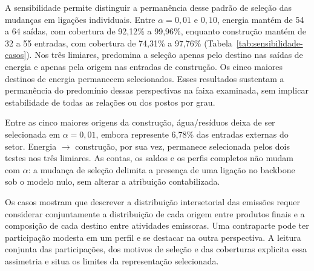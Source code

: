 A sensibilidade permite distinguir a permanência desse padrão de seleção das mudanças em ligações individuais. Entre $\alpha=0{,}01$ e $0{,}10$, energia mantém de 54 a 64 saídas, com cobertura de 92,12\% a 99,96\%, enquanto construção mantém de 32 a 55 entradas, com cobertura de 74,31\% a 97,76\% (Tabela~\ref{tab:sensibilidade-casos}). Nos três limiares, predomina a seleção apenas pelo destino nas saídas de energia e apenas pela origem nas entradas de construção. Os cinco maiores destinos de energia permanecem selecionados. Esses resultados sustentam a permanência do predomínio dessas perspectivas na faixa examinada, sem implicar estabilidade de todas as relações ou dos postos por grau.

Entre as cinco maiores origens da construção, água/resíduos deixa de ser selecionada em $\alpha=0{,}01$, embora represente 6,78\% das entradas externas do setor. Energia $\rightarrow$ construção, por sua vez, permanece selecionada pelos dois testes nos três limiares. As contas, os saldos e os perfis completos não mudam com $\alpha$: a mudança de seleção delimita a presença de uma ligação no backbone sob o modelo nulo, sem alterar a atribuição contabilizada.

Os casos mostram que descrever a distribuição intersetorial das emissões requer considerar conjuntamente a distribuição de cada origem entre produtos finais e a composição de cada destino entre atividades emissoras. Uma contraparte pode ter participação modesta em um perfil e se destacar na outra perspectiva. A leitura conjunta das participações, dos motivos de seleção e das coberturas explicita essa assimetria e situa os limites da representação selecionada.
\clearpage
